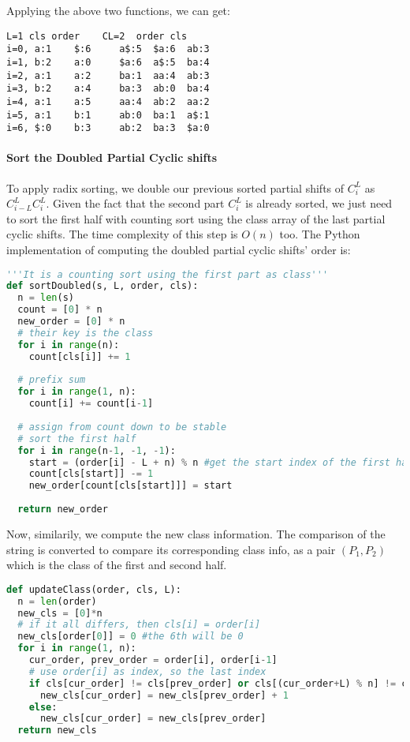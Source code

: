 \documentclass[../main.tex]{subfiles}
\begin{document}
Applying the above two functions, we can get:
\begin{lstlisting}[numbers=none]
   L=1 cls order    CL=2  order cls
i=0, a:1    $:6     a$:5  $a:6  ab:3
i=1, b:2    a:0     $a:6  a$:5  ba:4
i=2, a:1    a:2     ba:1  aa:4  ab:3
i=3, b:2    a:4     ba:3  ab:0  ba:4
i=4, a:1    a:5     aa:4  ab:2  aa:2
i=5, a:1    b:1     ab:0  ba:1  a$:1
i=6, $:0    b:3     ab:2  ba:3  $a:0
\end{lstlisting}

\paragraph{Sort the Doubled Partial Cyclic shifts} To apply radix sorting, we double our previous sorted partial shifts of $C^L_i$ as $C^{L}_{i-L}C^{L}_{i}$. Given the fact that the second part $C^{L}_{i}$ is already sorted, we just need to sort the first half with counting sort using the class array of the last partial cyclic shifts. The time complexity of this step is $O(n)$ too. The Python implementation of computing the doubled partial cyclic shifts' order is:
\begin{lstlisting}[language=Python]
'''It is a counting sort using the first part as class'''
def sortDoubled(s, L, order, cls):
  n = len(s)
  count = [0] * n
  new_order = [0] * n
  # their key is the class
  for i in range(n):
    count[cls[i]] += 1
    
  # prefix sum
  for i in range(1, n):
    count[i] += count[i-1]
    
  # assign from count down to be stable
  # sort the first half
  for i in range(n-1, -1, -1):
    start = (order[i] - L + n) % n #get the start index of the first half, 
    count[cls[start]] -= 1
    new_order[count[cls[start]]] = start
    
  return new_order
\end{lstlisting}

Now, similarily, we compute the new class information. The comparison of the string is converted to compare its corresponding class info, as a pair $(P_1, P_2)$ which is the class of the first and second half. 
\begin{lstlisting}[language=Python]
def updateClass(order, cls, L):
  n = len(order)
  new_cls = [0]*n
  # if it all differs, then cls[i] = order[i]
  new_cls[order[0]] = 0 #the 6th will be 0
  for i in range(1, n):
    cur_order, prev_order = order[i], order[i-1]
    # use order[i] as index, so the last index
    if cls[cur_order] != cls[prev_order] or cls[(cur_order+L) % n] != cls[(prev_order+L) % n]:
      new_cls[cur_order] = new_cls[prev_order] + 1
    else:
      new_cls[cur_order] = new_cls[prev_order]
  return new_cls
\end{lstlisting}
\end{document}
